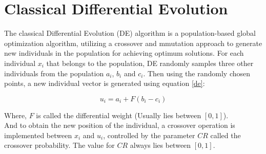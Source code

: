 


\section{Classical Differential Evolution}

The classical Differential Evolution (DE) algorithm is a population-based global optimization algorithm, utilizing a crossover and mmutation approach to generate new individuals in the population for achieving optimum solutions. For each individual $x_i$ that belongs to the population, DE randomly samples three other individuals from the population $a_i$, $b_i$ and $c_i$. Then using the randomly chosen points, a new individual vector is generated using equation \eqref{de}:

\begin{equation}
\label{de}
u_i = a_i + F (b_i - c_i)
\end{equation}

Where, $F$ is called the differential weight (Usually lies between $[0, 1]$).\\
And to obtain the new position of the individual, a crossover operation is implemented between $x_i$ and $u_i$, controlled by the parameter $CR$ called the crossover probability. The value for $CR$ always lies between $[0, 1]$.

